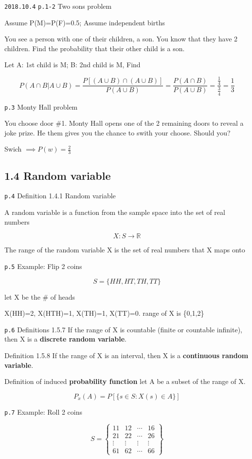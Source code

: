 \documentclass[]{tufte-book}
\begin{document}
\texttt{2018.10.4} \texttt{p.1-2} Two sons problem

Assume P(M)=P(F)=0.5; Assume independent births

You see a person with one of their children, a son. You know that they
have 2 children. Find the probability that their other child is a son.

Let A: 1st child is M; B: 2nd child is M, Find

\[P(A\cap B|A\cup B)=\frac{P[(A\cup B)\cap(A\cup B)]}{P(A\cup B)}=\frac{P(A\cap B)}{P(A\cup B)}=\frac{\frac14}{\frac34}=\frac13\]

\texttt{p.3} Monty Hall problem

You choose door \#1. Monty Hall opens one of the 2 remaining doors to
reveal a joke prize. He them gives you the chance to swith your choose.
Should you?

Swich \(\implies P(w)=\frac23\)

\hypertarget{random-variable}{%
\subsection{1.4 Random variable}\label{random-variable}}

\texttt{p.4} Definition 1.4.1 Random variable

A random variable is a function from the sample space into the set of
real numbers

\[X:S\to \mathbb{R}\]

The range of the random variable X is the set of real numbers that X
maps onto

\texttt{p.5} Example: Flip 2 coins

\[S=\{HH, HT, TH, TT\}\]

let X be the \# of heads

X(HH)=2, X(HTH)=1, X(TH)=1, X(TT)=0. range of X is \{0,1,2\}

\texttt{p.6} Definitions 1.5.7 If the range of X is countable (finite or
countable infinite), then X is a \textbf{discrete random variable}.

Definition 1.5.8 If the range of X is an interval, then X is a
\textbf{continuous random variable}.

Definition of induced \textbf{probability function} let A be a subset of
the range of X.

\[P_x(A)=P[\{s\in S: X(s)\in A\}]\]

\texttt{p.7} Example: Roll 2 coins

\[S=\begin{Bmatrix}
11 & 12 & \cdots & 16 \\ 
21 & 22 & \cdots & 26 \\ 
\vdots & \vdots & \vdots & \vdots \\
61 & 62 & \cdots & 66 \end{Bmatrix}\]
\end{document}
